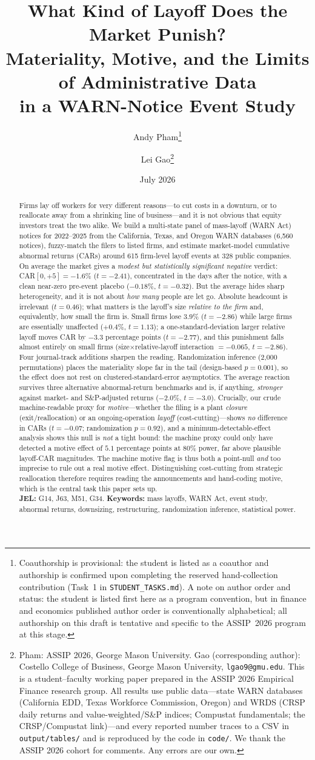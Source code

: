 \documentclass[12pt]{article}
\title{\textbf{What Kind of Layoff Does the Market Punish?\\
Materiality, Motive, and the Limits of Administrative Data\\
in a WARN-Notice Event Study}}
\author{Andy Pham\thanks{Coauthorship is provisional: the student is listed as a coauthor and authorship is confirmed upon completing the reserved hand-collection contribution (Task~1 in \texttt{STUDENT\_TASKS.md}). A note on author order and status: the student is listed first here as a program convention, but in finance and economics published author order is conventionally alphabetical; all authorship on this draft is tentative and specific to the ASSIP~2026 program at this stage.} \and Lei Gao\thanks{Pham: ASSIP 2026, George Mason University.
Gao (corresponding author): Costello College of Business, George Mason University,
\texttt{lgao9@gmu.edu}. This is a student--faculty working paper prepared in the
ASSIP 2026 Empirical Finance research group. All results use public data---state
WARN databases (California EDD, Texas Workforce Commission, Oregon) and WRDS
(CRSP daily returns and value-weighted/S\&P indices; Compustat fundamentals;
the CRSP/Compustat link)---and every reported number traces to a CSV in
\texttt{output/tables/} and is reproduced by the code in \texttt{code/}. We thank
the ASSIP 2026 cohort for comments. Any errors are our own.}}
\date{July 2026}
\begin{document}
\maketitle

\begin{abstract}
\noindent Firms lay off workers for very different reasons---to cut costs in a
downturn, or to reallocate away from a shrinking line of business---and it is not
obvious that equity investors treat the two alike. We build a multi-state panel
of mass-layoff (WARN Act) notices for 2022--2025 from the California, Texas, and
Oregon WARN databases (6{,}560 notices), fuzzy-match the filers to listed firms,
and estimate market-model cumulative abnormal returns (CARs) around 615
firm-level layoff events at 328 public companies. On average the market gives a
\emph{modest but statistically significant negative} verdict: CAR$[0,+5]=-1.6\%$
($t=-2.41$), concentrated in the days after the notice, with a clean near-zero
pre-event placebo ($-0.18\%$, $t=-0.32$). But the average hides sharp
heterogeneity, and it is not about \emph{how many} people are let go. Absolute
headcount is irrelevant ($t=0.46$); what matters is the layoff's size
\emph{relative to the firm} and, equivalently, how small the firm is. Small firms
lose $3.9\%$ ($t=-2.86$) while large firms are essentially unaffected ($+0.4\%$,
$t=1.13$); a one-standard-deviation larger relative layoff moves CAR by
$-3.3$ percentage points ($t=-2.77$), and this punishment falls almost entirely
on small firms (size$\times$relative-layoff interaction $=-0.065$, $t=-2.86$).
Four journal-track additions sharpen the reading. Randomization inference
(2{,}000 permutations) places the materiality slope far in the tail (design-based
$p=0.001$), so the effect does not rest on clustered-standard-error asymptotics.
The average reaction survives three alternative abnormal-return benchmarks and is,
if anything, \emph{stronger} against market- and S\&P-adjusted returns
($-2.0\%$, $t=-3.0$). Crucially, our crude machine-readable proxy for
\emph{motive}---whether the filing is a plant \emph{closure} (exit/reallocation)
or an ongoing-operation \emph{layoff} (cost-cutting)---shows \emph{no} difference
in CARs ($t=-0.07$; randomization $p=0.92$), and a minimum-detectable-effect
analysis shows this null is \emph{not} a tight bound: the machine proxy could only
have detected a motive effect of $5.1$ percentage points at 80\% power, far above
plausible layoff-CAR magnitudes. The machine motive flag is thus both a point-null
\emph{and} too imprecise to rule out a real motive effect. Distinguishing
cost-cutting from strategic reallocation therefore requires reading the
announcements and hand-coding motive, which is the central task this paper sets
up. \\[4pt]
\noindent\textbf{JEL:} G14, J63, M51, G34. \quad
\textbf{Keywords:} mass layoffs, WARN Act, event study, abnormal returns,
downsizing, restructuring, randomization inference, statistical power.
\end{abstract}
\end{document}

